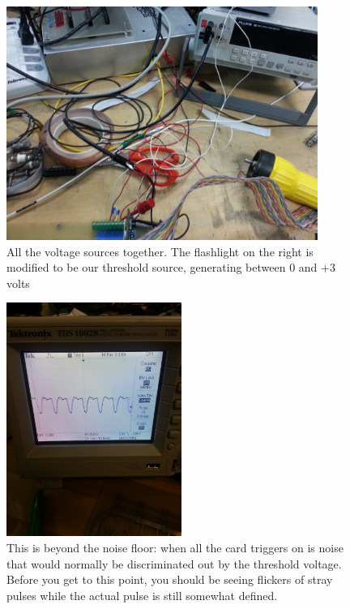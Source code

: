 \documentclass[final]{report}
\begin{document}
\begin{figure}[9]
  \centering
  \includegraphics[height=3in]{Figure9.jpg}
  \caption{All the voltage sources together. The flashlight on the right is modified to be our threshold source, generating between 0 and +3 volts}
  \label{fig:whatamess}
\end{figure}
\begin{figure}[10]
  \centering
  \includegraphics[height=3in, angle = -90]{Figure10.jpg}
  \caption{This is beyond the noise floor: when all the card triggers on is noise that would normally be discriminated out by the threshold voltage. Before you get to this point, you should be seeing flickers of stray pulses while the actual pulse is still somewhat defined.}
  \label{fig:noise}
\end{figure}
\end{document}
